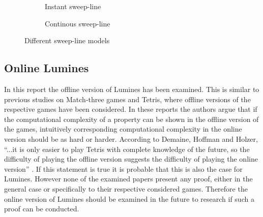 \begin{figure}[h]
    \centering
    \begin{subfigure}[b]{0.6\textwidth}
        \caption{Instant sweep-line}
        \vspace*{0.5cm}
    \end{subfigure}

    \begin{subfigure}[b]{0.6\textwidth}
        \caption{Continous sweep-line}
        \vspace*{0.5cm}
    \end{subfigure}
    \caption{Different sweep-line models}
    \label{fig:sweep}
\end{figure}


\subsection{Online Lumines}

In this report the offline version of Lumines has been examined. This is similar to previous studies on Match-three games and Tetris, where offline versions of the respective games have been considered. In these reports the authors argue that if the computational complexity of a property can be shown in the offline version of the games, intuitively corresponding computational complexity in the online version should be as hard or harder. According to Demaine, Hoffman and Holzer, ``...it is only easier to play Tetris with complete knowledge of the future, so the difficulty of playing the offline version suggests the difficulty of playing the online version'' \cite[p. 2]{tetris}. If this statement is true it is probable that this is also the case for Lumines. However none of the examined papers present any proof, either in the general case or specifically to their respective considered games. Therefore the online version of Lumines should be examined in the future to research if such a proof can be conducted.

